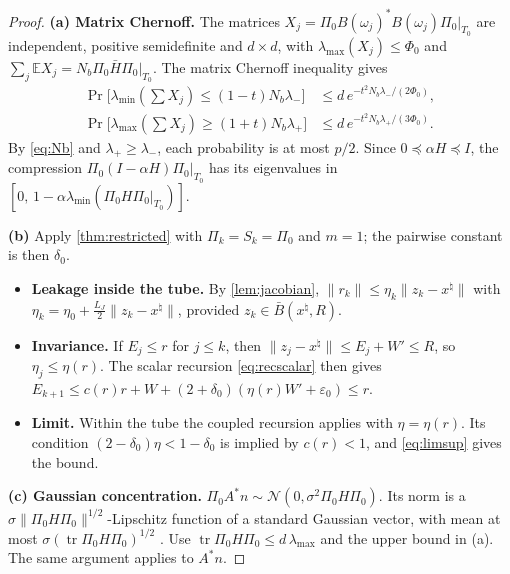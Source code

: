 \documentclass[11pt]{article}
\theoremstyle{definition}
\theoremstyle{remark}
\newcommand{\EE}{\mathbb E}
\newcommand{\norm}[1]{\lVert #1\rVert}
\newcommand{\tr}{\operatorname{tr}}
\newcommand{\lmin}{\lambda_{\min}}
\newcommand{\lmax}{\lambda_{\max}}
\newcommand{\Hb}{\bar H}
\newcommand{\xt}{x^\natural}
\begin{document}
\begin{proof}
\textbf{(a) Matrix Chernoff.} The matrices $X_j=\Pi_0B(\omega_j)^*B(\omega_j)\Pi_0|_{T_0}$ are independent, positive
semidefinite and $d\times d$, with $\lmax(X_j)\leq\Phi_0$ and $\sum_j\EE X_j=N_b\Pi_0\Hb\Pi_0|_{T_0}$. The matrix
Chernoff inequality \cite[Thm.~1.1]{tropp2012} gives
\begin{align*}
\Pr\big[\lmin(\textstyle\sum X_j)\leq(1-t)N_b\lambda_-\big]&\leq d\,e^{-t^2N_b\lambda_-/(2\Phi_0)},\\
\Pr\big[\lmax(\textstyle\sum X_j)\geq(1+t)N_b\lambda_+\big]&\leq d\,e^{-t^2N_b\lambda_+/(3\Phi_0)}.
\end{align*}
By \eqref{eq:Nb} and $\lambda_+\geq\lambda_-$, each probability is at most $p/2$. Since $0\preceq\alpha H\preceq I$,
the compression $\Pi_0(I-\alpha H)\Pi_0|_{T_0}$ has its eigenvalues in $[0,\,1-\alpha\lmin(\Pi_0H\Pi_0|_{T_0})]$.

\textbf{(b)} Apply \cref{thm:restricted} with $\Pi_k=S_k=\Pi_0$ and $m=1$; the pairwise constant is then $\delta_0$.
\begin{itemize}
\item \textbf{Leakage inside the tube.} By \cref{lem:jacobian}, $\norm{r_k}\leq\eta_k\norm{z_k-\xt}$ with
  $\eta_k=\eta_0+\frac{L_J}{2}\norm{z_k-\xt}$, provided $z_k\in\bar B(\xt,R)$.
\item \textbf{Invariance.} If $E_j\leq r$ for $j\leq k$, then $\norm{z_j-\xt}\leq E_j+W'\leq R$, so $\eta_j\leq\eta(r)$.
  The scalar recursion \eqref{eq:recscalar} then gives $E_{k+1}\leq c(r)r+W+(2+\delta_0)(\eta(r)W'+\varepsilon_0)\leq r$.
\item \textbf{Limit.} Within the tube the coupled recursion applies with $\eta=\eta(r)$. Its condition
  $(2-\delta_0)\eta<1-\delta_0$ is implied by $c(r)<1$, and \eqref{eq:limsup} gives the bound.
\end{itemize}

\textbf{(c) Gaussian concentration.} $\Pi_0A^*n\sim\mathcal N(0,\sigma^2\Pi_0H\Pi_0)$. Its norm is a
$\sigma\norm{\Pi_0H\Pi_0}^{1/2}$-Lipschitz function of a standard Gaussian vector, with mean at most
$\sigma(\tr\Pi_0H\Pi_0)^{1/2}$ \cite{boucheron2013}. Use $\tr\Pi_0H\Pi_0\leq d\,\lmax$ and the upper bound in (a).
The same argument applies to $A^*n$.
\end{proof}
\end{document}
